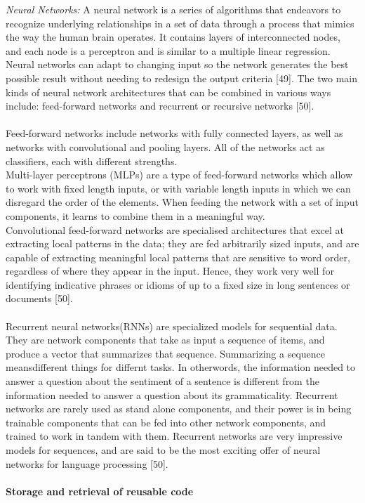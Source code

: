 \documentclass[a4paper]{article}
\begin{document}
\textit{Neural Networks:} A neural network is a series of algorithms that endeavors to recognize underlying relationships in a set of data through a process that mimics the way the human brain operates. It contains layers of interconnected nodes, and each node is a perceptron and is similar to a multiple linear regression. Neural networks can adapt to changing input so the network generates the best possible result without needing to redesign the output criteria [49].  The two main kinds of neural network architectures that can be combined in various ways include: feed-forward networks and recurrent or recursive networks [50]. \\ \\
Feed-forward networks include networks with fully connected layers, as well as networks with convolutional and pooling layers. All of the networks act as classifiers, each with different strengths. \\
Multi-layer perceptrons (MLPs) are a type of feed-forward networks which allow to work with fixed length inputs, or with variable length inputs in which we can disregard the order of the elements. When feeding the network with a set of input components, it learns to combine them in  a meaningful way. \\
Convolutional feed-forward networks are specialised architectures that excel at extracting local patterns in the data; they are fed arbitrarily sized inputs, and are capable of extracting meaningful local patterns that are sensitive to word order, regardless of where they appear in the input. Hence, they work very well for identifying indicative phrases or idioms of up to a fixed size in long sentences or documents [50]. 
\\ \\
Recurrent neural networks(RNNs) are specialized models for sequential data. They are network components that take as input a sequence of items, and produce a vector that summarizes that sequence. Summarizing a sequence meansdifferent things for differnt tasks. In otherwords, the information needed to answer a question about the sentiment of a sentence is different from the information needed to answer a question about its grammaticality.  Recurrent networks are rarely used as stand alone components, and their power is in being trainable components that can be fed into other network components, and trained to work in tandem with them. Recurrent networks are very impressive models for sequences, and are said to be the most exciting offer of neural networks for language processing [50]. \\ \\
{\bf Storage and retrieval of reusable code} \\
\end{document}
